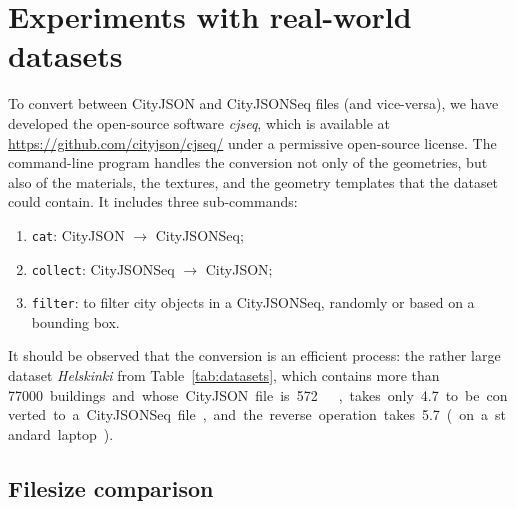 \documentclass{isprs} %
\begin{document}
%
\section{Experiments with real-world datasets}%
\label{sec:experiments}


To convert between CityJSON and CityJSONSeq files (and vice-versa), we have developed the open-source software \emph{cjseq}, which is available at \url{https://github.com/cityjson/cjseq/} under a permissive open-source license.
The command-line program handles the conversion not only of the geometries, but also of the materials, the textures, and the geometry templates that the dataset could contain.
It includes three sub-commands: 
\begin{enumerate}
  \item \texttt{cat}: CityJSON $\rightarrow$ CityJSONSeq;
  \item \texttt{collect}: CityJSONSeq $\rightarrow$ CityJSON;
  \item \texttt{filter}: to filter city objects in a CityJSONSeq, randomly or based on a bounding box.
\end{enumerate}

It should be observed that the conversion is an efficient process: the rather large dataset \emph{Helskinki} from Table~\ref{tab:datasets}, which contains more than \qty{77000} buildings and whose CityJSON file is \qty{572}{\mega\byte}, takes only \qty{4.7}{\sec} to be converted to a CityJSONSeq file, and the reverse operation takes \qty{5.7}{\sec} (on a standard laptop).



\subsection{Filesize comparison}
\end{document}
